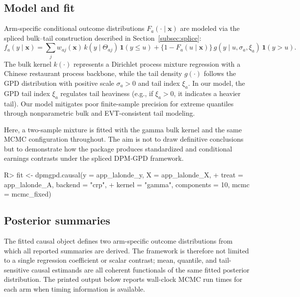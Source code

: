 \documentclass[11pt]{article}\usepackage[]{graphicx}\usepackage[]{xcolor}
\renewenvironment{Schunk}{\vspace{0pt}}{\vspace{-0.1\baselineskip}}
\begin{document}
\subsection{Model and fit}

Arm-specific conditional outcome distributions
$F_a(\cdot\mid \boldsymbol{x})$ are modeled via the spliced bulk--tail
construction described in Section~\ref{subsec:splice}:
\begin{equation*}
f_a(y\mid \boldsymbol{x})
=
\sum_j w_{aj}(\boldsymbol{x})\, k(y\mid \Theta_{aj})\,\mathbf{1}(y\le u)
+
\{1-F_a(u\mid \boldsymbol{x})\}\, g(y\mid u,\sigma_a,\xi_a)\,\mathbf{1}(y>u).
\end{equation*}
The bulk kernel $k(\cdot)$ represents a Dirichlet process mixture
regression with a Chinese restaurant process backbone, while the tail
density $g(\cdot)$ follows the GPD distribution with positive scale
$\sigma_a>0$ and tail index $\xi_a$. In our model, the GPD tail index
$\xi_a$ regulates tail heaviness (e.g., if $\xi_a>0$, it indicates a
heavier tail). Our model mitigates poor finite-sample precision for extreme
quantiles through nonparametric bulk and EVT-consistent tail modeling.

Here, a two-sample mixture is fitted with the gamma bulk kernel and the
same MCMC configuration throughout. The aim is not to draw definitive
conclusions but to demonstrate how the package produces standardized and
conditional earnings contrasts under the spliced DPM-GPD framework.

\begin{Schunk}
\begin{Sinput}
R> fit <- dpmgpd.causal(y = app_lalonde_y, X = app_lalonde_X,
+                       treat = app_lalonde_A,  backend = "crp",
+                       kernel = "gamma", components = 10,  mcmc = mcmc_fixed)
\end{Sinput}
\end{Schunk}



\subsection{Posterior summaries}

The fitted causal object defines two arm-specific outcome distributions
from which all reported summaries are derived. The framework is therefore
not limited to a single regression coefficient or scalar contrast; mean,
quantile, and tail-sensitive causal estimands are all coherent functionals
of the same fitted posterior distribution.
The printed output below reports wall-clock MCMC run times for each
arm when timing information is available.
\end{document}
